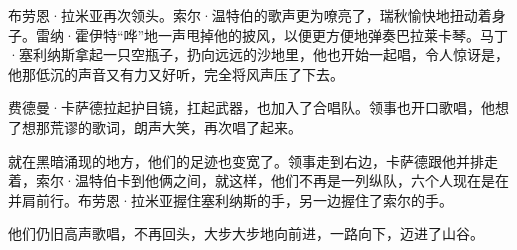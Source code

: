 \documentclass[AutoFakeBold=true]{book}
\begin{document}
布劳恩·拉米亚再次领头。索尔·温特伯的歌声更为嘹亮了，瑞秋愉快地扭动着身子。雷纳·霍伊特``哗''地一声甩掉他的披风，以便更方便地弹奏巴拉莱卡琴。马丁·塞利纳斯拿起一只空瓶子，扔向远远的沙地里，他也开始一起唱，令人惊讶是，他那低沉的声音又有力又好听，完全将风声压了下去。

费德曼·卡萨德拉起护目镜，扛起武器，也加入了合唱队。领事也开口歌唱，他想了想那荒谬的歌词，朗声大笑，再次唱了起来。

就在黑暗涌现的地方，他们的足迹也变宽了。领事走到右边，卡萨德跟他并排走着，索尔·温特伯卡到他俩之间，就这样，他们不再是一列纵队，六个人现在是在并肩前行。布劳恩·拉米亚握住塞利纳斯的手，另一边握住了索尔的手。

他们仍旧高声歌唱，不再回头，大步大步地向前进，一路向下，迈进了山谷。
\end{document}
